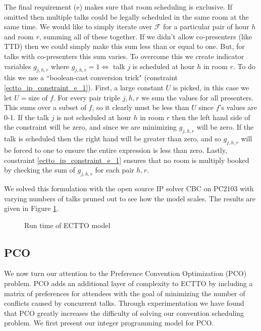 \documentclass[]{article}
\theoremstyle{definition}
\theoremstyle{remark}
\numberwithin{equation}{section}
\begin{document}
The final requirement (e) makes sure that room scheduling is exclusive. If omitted then multiple talks could be legally scheduled in the same room at the same time. We would like to simply iterate over $\mathcal F$ for a particular pair of hour $h$ and room $r$, summing all of these together. If we didn't allow co-presenters (like TTD) then we could simply make this sum less than or equal to one. But, for talks with co-presenters this sum varies. To overcome this we create indicator variables $g_{j,h,r}$ where $g_{j,h,r}=1 \iff$ talk $j$ is scheduled at hour $h$ in room $r$. To do this we use a ``boolean-cast conversion trick" (constraint \ref{ectto_ip_constraint_e_1}). First, a large constant $U$ is picked, in this case we let $U=\text{size of } f$. For every pair triple $j,h,r$ we sum the values for all presenters. This sums over a subset of $f$, so it clearly must be less than $U$ since $f$'s values are 0-1. If the talk $j$ is not scheduled at hour $h$ in room $r$ then the left hand side of the constraint will be zero, and since we are minimizing $g_{j,h,r}$ will be zero. If the talk is scheduled then the right hand will be greater than zero, and so $g_{j,h,r}$ will be forced to one to ensure the entire expression is less than zero. Lastly, constraint \ref{ectto_ip_constraint_e_1} ensures that no room is multiply booked by checking the sum of $g_{j,h,r}$ for each pair $h,r$.

We solved this formulation with the open source IP solver CBC on PC2103 with varying numbers of talks pruned out to see how the model scales. The results are given in Figure \ref{ectto_run_time}.
\begin{figure}[h!]
	\caption{Run time of ECTTO model}
	\centering
		
	\label{ectto_run_time}
\end{figure}

\subsection{PCO}
We now turn our attention to the Preference Convention Optimization (PCO) problem. PCO adds an additional layer of complexity to ECTTO by including a matrix of preferences for attendees with the goal of minimizing the number of conflicts caused by concurrent talks. Through experimentation we have found that PCO greatly increases the difficulty of solving our convention scheduling problem. We first present our integer programming model for PCO.
\end{document}
